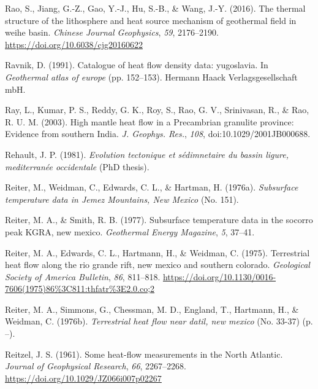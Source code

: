 \begin{CSLReferences}{1}{1}
\leavevmode{}%
Rao, S., Jiang, G.-Z., Gao, Y.-J., Hu, S.-B., \& Wang, J.-Y. (2016). The thermal structure of the lithosphere and heat source mechanism of geothermal field in weihe basin. \emph{Chinese Journal Geophysics}, \emph{59}, 2176--2190. \url{https://doi.org/10.6038/cjg20160622}

\leavevmode{}%
Ravnik, D. (1991). Catalogue of heat flow density data: yugoslavia. In \emph{Geothermal atlas of europe} (pp. 152--153). Hermann Haack Verlagsgesellschaft mbH.

\leavevmode{}%
Ray, L., Kumar, P. S., Reddy, G. K., Roy, S., Rao, G. V., Srinivasan, R., \& Rao, R. U. M. (2003). High mantle heat flow in a {Precambrian} granulite province: Evidence from southern {India}. \emph{J. Geophys. Res.}, \emph{108}, doi:10.1029/2001JB000688.

\leavevmode{}%
Rehault, J. P. (1981). \emph{Evolution tectonique et sédimnetaire du bassin ligure, mediterranée occidentale} (PhD thesis).

\leavevmode{}%
Reiter, M., Weidman, C., Edwards, C. L., \& Hartman, H. (1976a). \emph{Subsurface temperature data in {Jemez Mountains, New Mexico}} (No. 151).

\leavevmode{}%
Reiter, M. A., \& Smith, R. B. (1977). Subsurface temperature data in the socorro peak KGRA, new mexico. \emph{Geothermal Energy Magazine}, \emph{5}, 37--41.

\leavevmode{}%
Reiter, M. A., Edwards, C. L., Hartmann, H., \& Weidman, C. (1975). Terrestrial heat flow along the rio grande rift, new mexico and southern colorado. \emph{Geological Society of America Bulletin}, \emph{86}, 811--818. \url{https://doi.org/10.1130/0016-7606(1975)86\%3C811:thfatr\%3E2.0.co;2}

\leavevmode{}%
Reiter, M. A., Simmons, G., Chessman, M. D., England, T., Hartmann, H., \& Weidman, C. (1976b). \emph{Terrestrial heat flow near datil, new mexico} (No. 33-37) (p. --).

\leavevmode{}%
Reitzel, J. S. (1961). Some heat-flow measurements in the {North Atlantic}. \emph{Journal of Geophysical Research}, \emph{66}, 2267--2268. \url{https://doi.org/10.1029/JZ066i007p02267}


\end{CSLReferences}
